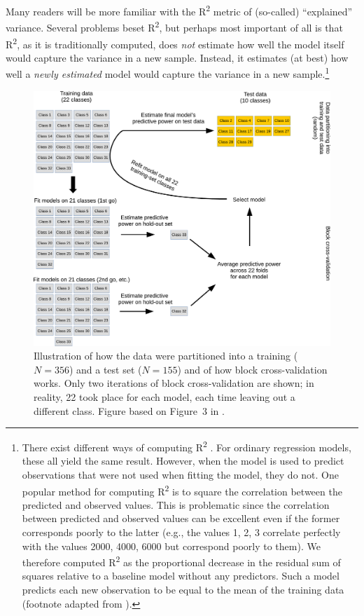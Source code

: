 \documentclass[output=paper]{langsci/langscibook}
\begin{document}
\begin{sloppypar}
Many readers will be more familiar with the R\textsuperscript{2} metric of (so-called) ``explained'' variance. Several problems beset R\textsuperscript{2}, but perhaps most important of all is that R\textsuperscript{2}, as it is traditionally computed, does \textit{not} estimate how well the model itself would capture the variance in a new sample. Instead, it estimates (at best) how well a \textit{newly estimated} model would capture the variance in a new sample.\footnote{There exist different ways of computing R\textsuperscript{2} \citep{Kvålseth1985}. For ordinary regression models, these all yield the same result. However, when the model is used to predict observations that were not used when fitting the model, they do not. One popular method for computing R\textsuperscript{2} is to square the correlation between the predicted and observed values. This is problematic since the correlation between predicted and observed values can be excellent even if the former corresponds poorly to the latter (e.g., the values 1, 2, 3 correlate perfectly with the values 2000, 4000, 6000 but correspond poorly to them). We therefore computed R\textsuperscript{2} as the proportional decrease in the residual sum of squares relative to a baseline model without any predictors. Such a model predicts each new observation to be equal to the mean of the training data (footnote adapted from \citealt{VanhoveEtAl2019}).}
\end{sloppypar}\newpage
\hbox{}\vfill
\begin{figure}[H]
\includegraphics[width=\textwidth]{figures/figure4.1.cross-validation.pdf}
\caption{Illustration of how the data were partitioned into a training ($N=356$) and a test set ($N=155$) and of how block cross-validation works. Only two iterations of block cross-validation are shown; in reality, 22 took place for each model, each time leaving out a different class. Figure based on Figure~3 in \citet{VanhoveEtAl2019}.}
\label{fig:04:1}
\end{figure}
\vfill\hbox{}
\clearpage
\end{document}
